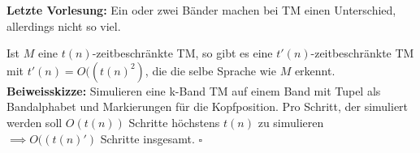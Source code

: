 
\textbf{Letzte Vorlesung:} Ein oder zwei Bänder machen bei TM einen Unterschied, allerdings nicht so viel.

\begin{satz}{}
    Ist $M$ eine $t(n)$-zeitbeschränkte TM, so gibt es eine $t'(n)$-zeitbeschränkte TM mit $t'(n) = O((t(n)^2)$, die die selbe Sprache wie $M$ erkennt.\\
    
    \textbf{Beiweisskizze:} Simulieren eine k-Band TM auf einem Band mit Tupel als Bandalphabet und Markierungen für die Kopfposition. Pro Schritt, der simuliert werden soll $O(t(n))$ Schritte höchstens $t(n)$ zu simulieren $\implies O((t(n)')$ Schritte insgesamt. \hspace*{\fill}$\square$
\end{satz}

